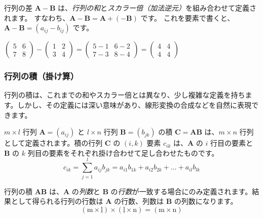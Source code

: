 行列の差 $\bm{A} - \bm{B}$ は、\emph{行列の和}と\emph{スカラー倍（加法逆元）}を組み合わせて定義されます。
すなわち、$\bm{A} - \bm{B} = \bm{A} + (-\bm{B})$ です。
これを要素で書くと、$\bm{A} - \bm{B} = (a_{ij} - b_{ij})$ です。

\begin{ex}
$\begin{pmatrix} 5 & 6 \\ 7 & 8 \end{pmatrix} - \begin{pmatrix} 1 & 2 \\ 3 & 4 \end{pmatrix} = \begin{pmatrix} 5-1 & 6-2 \\ 7-3 & 8-4 \end{pmatrix} = \begin{pmatrix} 4 & 4 \\ 4 & 4 \end{pmatrix}$
\end{ex}

\subsubsection{行列の積（掛け算）}
行列の積は、これまでの和やスカラー倍とは異なり、少し複雑な定義を持ちます。しかし、その定義には深い意味があり、線形変換の合成などを自然に表現できます。

\begin{dfn}[行列の積]
$m \times l$ 行列 $\bm{A} = (a_{ij})$ と $l \times n$ 行列 $\bm{B} = (b_{jk})$ の積 $\bm{C} = \bm{A}\bm{B}$ は、$m \times n$ 行列として定義されます。積の行列 $\bm{C}$ の $(i,k)$ 要素 $c_{ik}$ は、$\bm{A}$ の $i$ 行目の要素と $\bm{B}$ の $k$ 列目の要素をそれぞれ掛け合わせて足し合わせたものです。
\[c_{ik} = \sum_{j=1}^{l} a_{ij} b_{jk} = a_{i1}b_{1k} + a_{i2}b_{2k} + \dots + a_{il}b_{lk}\]
\end{dfn}
\begin{rmk*}
行列の積 $\bm{A}\bm{B}$ は、$\bm{A}$ の\emph{列数}と $\bm{B}$ の\emph{行数}が一致する場合にのみ定義されます。結果として得られる行列の行数は $\bm{A}$ の行数、列数は $\bm{B}$ の列数になります。
\[(\text{m} \times \underline{\text{l}}) \times (\underline{\text{l}} \times \text{n}) = (\text{m} \times \text{n})\]
\end{rmk*}


